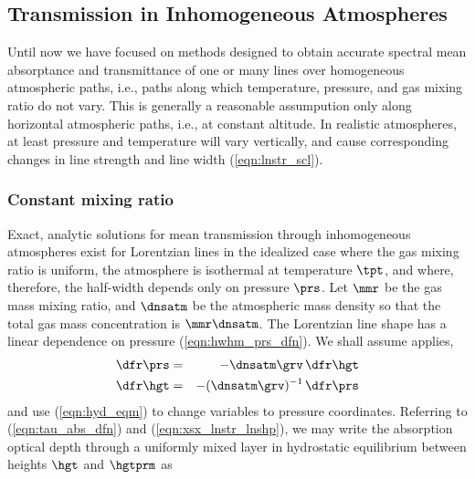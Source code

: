 \documentclass[12pt]{article}
\begin{document}
\subsection[Transmission in Inhomogeneous Atmospheres]{Transmission in Inhomogeneous Atmospheres}\label{sxn:tia}
Until now we have focused on methods designed to obtain accurate 
spectral mean absorptance and transmittance of one or many lines
over homogeneous atmospheric paths, i.e., paths along which
temperature, pressure, and gas mixing ratio do not vary.
This is generally a reasonable assumpution only along horizontal
atmospheric paths, i.e., at constant altitude.
In realistic atmospheres, at least pressure and temperature
will vary vertically, and cause corresponding changes in line strength
and line width (\ref{eqn:lnstr_scl}). 

\subsubsection[Constant mixing ratio]{Constant mixing ratio}\label{sxn:cmr}
Exact, analytic solutions for mean transmission through inhomogeneous
atmospheres exist for Lorentzian lines in the idealized case where the
gas mixing ratio is uniform, the atmosphere is isothermal at
temperature $\tpt$, and where, therefore, the half-width depends only 
on pressure $\prs$.  
Let $\mmr$ be the gas mass mixing ratio, and $\dnsatm$ be the
atmospheric mass density so that the total gas mass concentration is
$\mmr\dnsatm$.
The Lorentzian line shape has a linear dependence on pressure
(\ref{eqn:hwhm_prs_dfn}).
We shall assume  applies,
\begin{eqnarray}
\dfr\prs & = & -\dnsatm \grv \,\dfr\hgt \nonumber \\
\dfr\hgt & = & -(\dnsatm \grv)^{-1} \,\dfr\prs
\label{eqn:hyd_eqm}
\end{eqnarray}
and use (\ref{eqn:hyd_eqm}) to change variables to pressure
coordinates. 
Referring to (\ref{eqn:tau_abs_dfn}) and (\ref{eqn:xsx_lnstr_lnshp}), 
we may write the absorption optical depth through a uniformly mixed
layer in hydrostatic equilibrium between heights $\hgt$ and $\hgtprm$
as 
\end{document}
